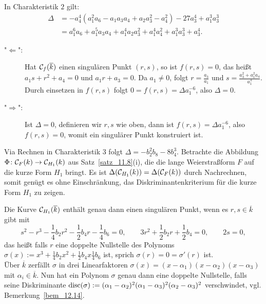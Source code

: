 \begin{bew}[2. Fall: $\Char(k) = 2$ und $a_1 \neq 0$]
	In Charakteristik $2$ gilt:
	\begin{equation}
	\begin{aligned}
		\Delta &= -a_4^4 (a_1^2 a_6 - a_1 a_3 a_4 + a_2 a_3^2 - a_4^2) - 27a_3^4 + a_1^3 a_3^3 \\
		&= a_1^6 a_6 + a_1^5 a_3a_4 + a_1^4a_2a_3^2 + a_1^4a_4^2 + a_1^3 a_3^3 +a_3^4.
	\end{aligned}
	\end{equation}
	\begin{description}
		\item["$\Leftarrow$":] Hat $\mathcal{C}_f(\overline{k})$ einen singulären Punkt $(r,s)$, so ist $f(r,s) = 0$, das heißt $a_1 s + r^2 + a_4 = 0$ und $a_1 r + a_3 = 0$. 
		Da $a_1 \neq 0$, folgt $r = \frac{a_3}{a_1}$ und $s = \frac{a_3^2+a_1^2a_4}{a_1^3}$. 
		Durch einsetzen in $f(r,s)$ folgt $0 = f(r,s) = \Delta a_1^{-6}$, also $\Delta = 0$.		
		\item["$\Rightarrow$":] Ist $\Delta = 0$, definieren wir $r,s$ wie oben, dann ist $f(r,s) = \Delta a_1^{-6}$, also $f(r,s) = 0$, womit ein singulärer Punkt konstruiert ist.
	\end{description}
\end{bew}

\begin{bew}[3. Fall: $\Char(k)=3$]
	Via Rechnen in Charakteristik $3$ folgt $\Delta = -b_2^2 b_8 - 8b_4^3$. 
	Betrachte die Abbildung $\Phi\colon \mathcal{C}_F(k) \rightarrow \mathcal{C}_{H_1}(k)$ aus Satz~\ref{satz_11.8}(i), die die lange Weierstraßform $F$ auf die kurze Form $H_1$ bringt. 
	Es ist $\Delta(\mathcal{C}_{H_1}(k)) = \Delta(\mathcal{C}_F(k))$ durch Nachrechnen, somit genügt es ohne Einschränkung, das Diskriminantenkriterium für die kurze Form $H_1$ zu zeigen.
\end{bew}

\begin{bew}
	Die Kurve $\mathcal{C}_{H_1}(\overline{k})$ enthält genau dann einen singulären Punkt, wenn es $r,s \in \overline{k}$ gibt mit
	\[ s^2 - r^3 - \frac{1}{4} b_2 r^2 - \frac{1}{2}b_4 r - \frac{1}{4} b_6 = 0, \qquad 3r^2 + \frac{1}{2} b_2r + \frac{1}{2} b_4 = 0,  \qquad 2s = 0, \]
	das heißt falls $r$ eine doppelte Nullstelle des Polynoms $\sigma(x) := x^3 + \frac{1}{4} b_2 x^2 + \frac{1}{2} b_4x \frac{1}{4} b_6$ ist, sprich $\sigma(r) = 0 = \sigma'(r)$ ist. \\
	Über $\overline{k}$ zerfällt $\sigma$ in drei Linearfaktoren $\sigma(x) = (x-\alpha_1)(x-\alpha_2)(x-\alpha_3)$ mit $\alpha_i \in \overline{k}$. 
	Nun hat ein Polynom $\sigma$ genau dann eine doppelte Nullstelle, falls seine Diskriminante $\operatorname{disc}(\sigma) := (\alpha_1 - \alpha_2)^2 (\alpha_1 - \alpha_3)^2 (\alpha_2 - \alpha_3)^2$ verschwindet, vgl. Bemerkung~\ref{bem_12.14}.
\end{bew}

